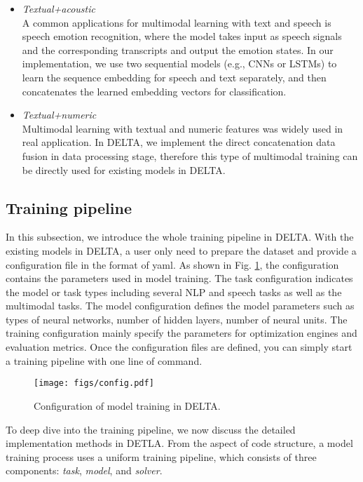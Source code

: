 \documentclass{article}
\begin{document}
\begin{itemize}
    \item \textit{Textual+acoustic}\\
    A common applications for multimodal learning with text and speech is speech emotion recognition, where the model takes input as speech signals and the corresponding transcripts and output the emotion states. In our implementation, we use two sequential models (e.g., CNNs or LSTMs) to learn the sequence embedding for speech and text separately, and then concatenates the learned embedding vectors for classification.

    \item \textit{Textual+numeric}\\
    Multimodal learning with textual and numeric features was widely used in real application. In DELTA, we implement the direct concatenation data fusion in data processing stage, therefore this type of multimodal training can be directly used for existing models in DELTA.
\end{itemize}

\subsection{Training pipeline}

In this subsection, we introduce the whole training pipeline in DELTA. With the existing models in DELTA, a user only need to prepare the dataset and provide a configuration file in the format of yaml. As shown in Fig. \ref{fig:config}, the configuration contains the parameters used in model training. The task configuration indicates the model or task types including several NLP and speech tasks as well as the multimodal tasks. The model configuration defines the model parameters such as types of neural networks, number of hidden layers, number of neural units. The training configuration mainly specify the parameters for optimization engines and evaluation metrics. Once the configuration files are defined, you can simply start a training pipeline with one line of command.

\begin{figure}[htbp]
  \centering
\texttt{[image: figs/config.pdf]}
  \caption{Configuration of model training in DELTA.}
  \label{fig:config}
\end{figure}

To deep dive into the training pipeline, we now discuss the detailed implementation methods in DETLA. From the aspect of code structure, a model training process uses a uniform training pipeline, which consists of three components: \textit{task}, \textit{model}, and \textit{solver}.
\end{document}
